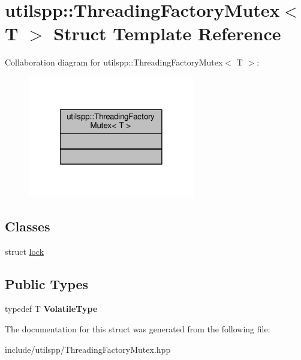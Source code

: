 \hypertarget{structutilspp_1_1ThreadingFactoryMutex}{\section{utilspp\-:\-:Threading\-Factory\-Mutex$<$ T $>$ Struct Template Reference}
\label{structutilspp_1_1ThreadingFactoryMutex}
}


Collaboration diagram for utilspp\-:\-:Threading\-Factory\-Mutex$<$ T $>$\-:\nopagebreak
\begin{figure}[H]
\begin{center}
\leavevmode
\includegraphics[width=206pt]{structutilspp_1_1ThreadingFactoryMutex__coll__graph}
\end{center}
\end{figure}
\subsection*{Classes}
\begin{DoxyCompactItemize}
\item 
struct \hyperlink{structutilspp_1_1ThreadingFactoryMutex_1_1lock}{lock}
\end{DoxyCompactItemize}
\subsection*{Public Types}
\begin{DoxyCompactItemize}
\item 
\hypertarget{structutilspp_1_1ThreadingFactoryMutex_afdadf1959c497182105f8196b02a8656}{typedef T {\bfseries Volatile\-Type}}\label{structutilspp_1_1ThreadingFactoryMutex_afdadf1959c497182105f8196b02a8656}

\end{DoxyCompactItemize}


The documentation for this struct was generated from the following file\-:\begin{DoxyCompactItemize}
\item 
include/utilspp/Threading\-Factory\-Mutex.\-hpp\end{DoxyCompactItemize}
